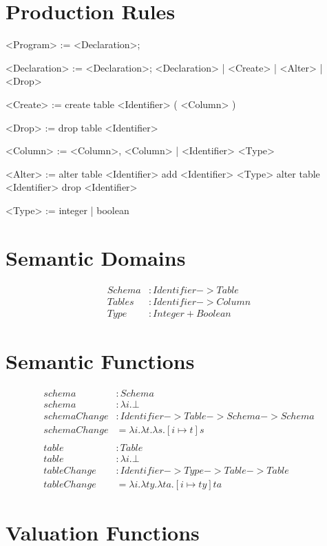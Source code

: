 \documentclass[12pt]{article}
\begin{document}
\section{Production Rules}
\begin{grammar}
  <Program> := <Declaration>;

  <Declaration> := <Declaration>; <Declaration> | <Create> | <Alter> | <Drop>

  <Create> := create table <Identifier> ( <Column> )

  <Drop> := drop table <Identifier>

  <Column> := <Column>, <Column> | <Identifier> <Type>

  <Alter> := alter table <Identifier> add <Identifier> <Type>
           \alt alter table <Identifier> drop <Identifier>

  <Type> := integer | boolean
\end{grammar}

\section{Semantic Domains}
\begin{align*}
  Schema &: Identifier -> Table \\
  Tables &: Identifier -> Column \\
  Type &: Integer + Boolean
\end{align*}

\section{Semantic Functions}
\begin{align*}
  schema &: Schema \\
  schema &: \lambda i.\bot \\
  schemaChange &: Identifier -> Table -> Schema -> Schema \\
  schemaChange &= \lambda i. \lambda t. \lambda s. [ i \mapsto t ]s \\
  \\
  table &: Table \\
  table &: \lambda i.\bot \\
  tableChange &: Identifier -> Type -> Table -> Table \\
  tableChange &= \lambda i. \lambda ty. \lambda ta. [ i \mapsto ty ]ta
\end{align*}

\section{Valuation Functions}
\end{document}
